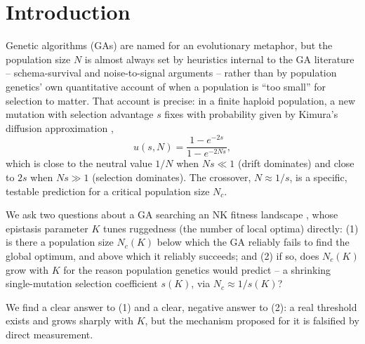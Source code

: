 \section{Introduction}

Genetic algorithms (GAs) are named for an evolutionary metaphor, but the
population size $N$ is almost always set by heuristics internal to the GA
literature -- schema-survival and noise-to-signal arguments
\cite{goldberg1991sizing} -- rather than by population genetics' own
quantitative account of when a population is ``too small'' for selection
to matter. That account is precise: in a finite haploid population, a new
mutation with selection advantage $s$ fixes with probability given by
Kimura's diffusion approximation \cite{kimura1962probability},
\[
u(s,N) = \frac{1-e^{-2s}}{1-e^{-2Ns}},
\]
which is close to the neutral value $1/N$ when $Ns \ll 1$ (drift
dominates) and close to $2s$ when $Ns \gg 1$ (selection dominates). The
crossover, $N \approx 1/s$, is a specific, testable prediction for a
critical population size $N_c$.

We ask two questions about a GA searching an NK fitness landscape
\cite{kauffman1987towards}, whose epistasis parameter $K$ tunes
ruggedness (the number of local optima) directly: (1) is there a
population size $N_c(K)$ below which the GA reliably fails to find the
global optimum, and above which it reliably succeeds; and (2) if so, does
$N_c(K)$ grow with $K$ for the reason population genetics would predict --
a shrinking single-mutation selection coefficient $s(K)$, via
$N_c \approx 1/s(K)$?

We find a clear answer to (1) and a clear, negative answer to (2): a
real threshold exists and grows sharply with $K$, but the mechanism
proposed for it is falsified by direct measurement.
